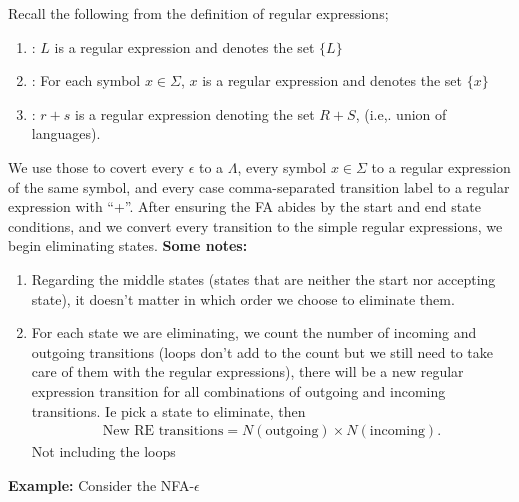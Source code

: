 \documentclass{report}
\begin{document}
\begin{itemize}
        \bigbreak \noindent 
        Recall the following from the definition of regular expressions;
        \begin{enumerate}[label=(\roman*)]
            \item {}: $L$ is a regular expression and denotes the set $\{L\}$
            \item  {}: For each symbol $x\in\Sigma$, $x$ is a regular expression and denotes the set $\{x\}$
            \item  {}: $r+s$ is a regular expression denoting the set $R + S$, (i.e,. union of languages).                       
        \end{enumerate}
        \bigbreak \noindent 
        We use those to covert every $\epsilon$ to a $\Lambda$, every symbol $x\in\Sigma$ to a regular expression of the same symbol, and every case comma-separated transition label to a regular expression with “+”.
        \bigbreak \noindent 
        After ensuring the FA abides by the start and end state conditions, and we convert every transition to the simple regular expressions, we begin eliminating states.
        \bigbreak \noindent 
        \textbf{Some notes:}
        \begin{enumerate}[label=(\alph*)]
            \item Regarding the middle states (states that are neither the start nor accepting state), it doesn't matter in which order we choose to eliminate them.
            \item For each state we are eliminating, we count the number of incoming and outgoing transitions (loops don't add to the count but we still need to take care of them with the regular expressions), there will be a new regular expression transition for all combinations of outgoing and incoming transitions. Ie pick a state to eliminate, then
                \begin{align*}
                    \text{New RE transitions} = N(\text{outgoing}) \times N(\text{incoming}) 
                .\end{align*}
                Not including the loops
        \end{enumerate}
        \pagebreak \bigbreak \noindent 
        \textbf{Example:} Consider the NFA-$\epsilon$
        \bigbreak \noindent 
        \begin{figure}[ht]
            \centering
            \label{fig:re1}
        \end{figure}
        \bigbreak \noindent 

\end{itemize}
\end{document}
